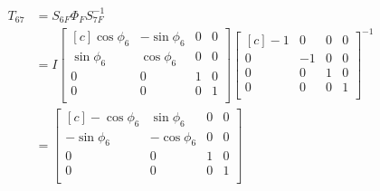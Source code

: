 \documentclass[onecolumn,10pt]{jhwhw}
\begin{document}
\begin{align*}
T_{67} &= S_{6F} \Phi_F S_{7F}^{-1} \\
&= I 
\begin{bmatrix*}[c]
\cos \phi_6 & -\sin \phi_6 & 0 & 0 \\
\sin \phi_6 &  \cos \phi_6 & 0 & 0 \\
          0 &            0 & 1 & 0 \\
          0 &            0 & 0 & 1 \\
\end{bmatrix*}
\begin{bmatrix*}[c]
-1 & 0 & 0 & 0 \\
0 & -1 & 0 & 0 \\
0 & 0 & 1 & 0 \\
0 & 0 & 0 & 1 \\
\end{bmatrix*}^{-1} \\
&= 
\begin{bmatrix*}[c]
-\cos \phi_6 &  \sin \phi_6 & 0 & 0 \\
-\sin \phi_6 & -\cos \phi_6 & 0 & 0 \\
         0 &          0 & 1 & 0 \\
         0 &          0 & 0 & 1 \\
\end{bmatrix*}
\end{align*}
\end{document}
